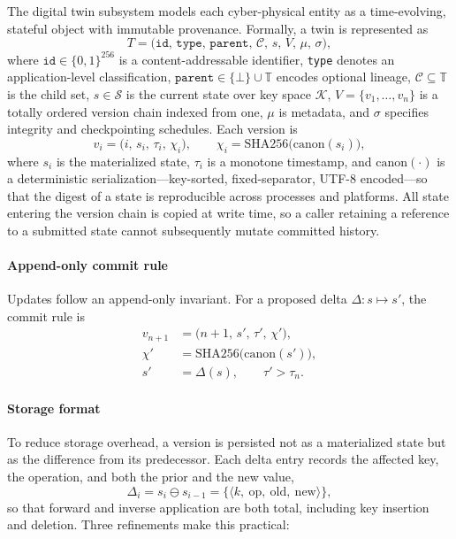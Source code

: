 \documentclass[final,5p,times,twocolumn]{elsarticle}
\begin{document}
The digital twin subsystem models each cyber-physical entity as a time-evolving, stateful object with immutable provenance. Formally, a twin is represented as
\begin{equation}
  T=\big(\texttt{id},\,\texttt{type},\,\texttt{parent},\,\mathcal{C},\,s,\,V,\,\mu,\,\sigma\big),
  \label{eq:dt_tuple}
\end{equation}
where $\texttt{id}\in\{0,1\}^{256}$ is a content-addressable identifier, \texttt{type} denotes an application-level classification, $\texttt{parent}\in\{\bot\}\cup\mathbb{T}$ encodes optional lineage, $\mathcal{C}\subseteq\mathbb{T}$ is the child set, $s\in\mathcal{S}$ is the current state over key space $\mathcal{K}$, $V=\{v_1,\ldots,v_n\}$ is a totally ordered version chain indexed from one, $\mu$ is metadata, and $\sigma$ specifies integrity and checkpointing schedules. Each version is
\begin{equation}
  v_i=\big(i,\,s_i,\,\tau_i,\,\chi_i\big),
  \qquad
  \chi_i=\mathrm{SHA256}\!\big(\mathrm{canon}(s_i)\big),
  \label{eq:dt_version}
\end{equation}
where $s_i$ is the materialized state, $\tau_i$ is a monotone timestamp, and $\mathrm{canon}(\cdot)$ is a deterministic serialization---key-sorted, fixed-separator, UTF-8 encoded---so that the digest of a state is reproducible across processes and platforms. All state entering the version chain is copied at write time, so a caller retaining a reference to a submitted state cannot subsequently mutate committed history.

\paragraph*{\textbf{Append-only commit rule}}
Updates follow an append-only invariant. For a proposed delta $\Delta:s\mapsto s'$, the commit rule is
\begin{subequations}
\begin{align}
  v_{n+1} &= \big(n{+}1,\,s',\,\tau',\,\chi'\big), \label{eq:commit_newver}\\
  \chi'   &= \mathrm{SHA256}\!\big(\mathrm{canon}(s')\big), \label{eq:commit_hash}\\
  s'      &= \Delta(s),\qquad \tau' > \tau_n. \label{eq:commit_delta}
\end{align}
\end{subequations}

\paragraph*{\textbf{Storage format}}
To reduce storage overhead, a version is persisted not as a materialized state but as the difference from its predecessor. Each delta entry records the affected key, the operation, and both the prior and the new value,
\begin{equation}
  \Delta_i = s_i \ominus s_{i-1}
  = \big\{\langle k,\ \mathrm{op},\ \mathrm{old},\ \mathrm{new}\rangle\big\},
  \label{eq:delta_store}
\end{equation}
so that forward and inverse application are both total, including key insertion and deletion. Three refinements make this practical:
\end{document}
